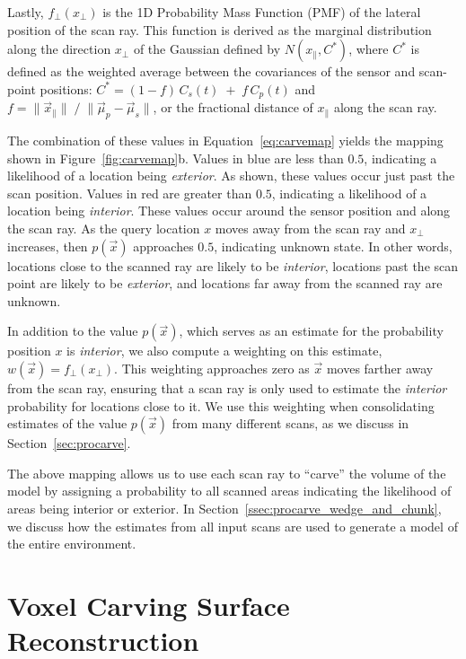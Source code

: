 \documentclass[12pt,onecolumn,oneside]{book}
\begin{document}
Lastly, $f_{\perp}(x_{\perp})$ is the 1D Probability Mass Function (PMF) of the lateral position of the scan ray.  This function is derived as the marginal distribution along the direction $x_{\perp}$ of the Gaussian defined by $N(x_{\parallel}, C^*)$, where $C^*$ is defined as the weighted average between the covariances of the sensor and scan-point positions:  $C^* = ( 1-f ) \,  C_s(t) \; + \; f \, C_p(t)$ and $f = \| \vec{x}_{\parallel} \| \; / \; \| \vec{\mu}_p - \vec{\mu}_s \|$, or the fractional distance of $x_{\parallel}$ along the scan ray.

The combination of these values in Equation~\ref{eq:carvemap} yields the mapping shown in Figure~\ref{fig:carvemap}b.  Values in blue are less than $0.5$, indicating a likelihood of a location being {\it exterior}.  As shown, these values occur just past the scan position.  Values in red are greater than $0.5$, indicating a likelihood of a location being {\it interior}.  These values occur around the sensor position and along the scan ray.  As the query location $x$ moves away from the scan ray and $x_{\perp}$ increases, then $p(\vec{x})$ approaches $0.5$, indicating unknown state.  In other words, locations close to the scanned ray are likely to be {\it interior}, locations past the scan point are likely to be {\it exterior}, and locations far away from the scanned ray are unknown.

In addition to the value $p(\vec{x})$, which serves as an estimate for the probability position $x$ is {\it interior}, we also compute a weighting on this estimate, $w(\vec{x}) = f_{\perp}(x_{\perp})$.  This weighting approaches zero as $\vec{x}$ moves farther away from the scan ray, ensuring that a scan ray is only used to estimate the {\it interior} probability for locations close to it.  We use this weighting when consolidating estimates of the value $p(\vec{x})$ from many different scans, as we discuss in Section~\ref{sec:procarve}.

The above mapping allows us to use each scan ray to ``carve'' the volume of the model by assigning a probability to all scanned areas indicating the likelihood of areas being interior or exterior.  In Section~\ref{ssec:procarve_wedge_and_chunk}, we discuss how the estimates from all input scans are used to generate a model of the entire environment.  

\section{Voxel Carving Surface Reconstruction}
\label{sec:3dv2013}
\end{document}
